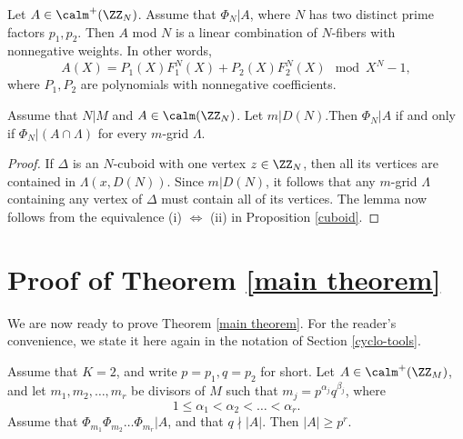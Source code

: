 \begin{lemma}\label{structure-thm} 
Let $A\in\calm^+(\ZZ_N)$.
Assume that $\Phi_{N}|A$, where $N$ has two distinct prime factors $p_1,p_2$. Then $A$ mod $N$ is a linear combination of $N$-fibers with nonnegative weights. In other words,
$$A(X)=P_1(X)F^N_1(X)+ P_2(X)F^N_2(X) \mod X^N-1,$$
where $P_1,P_2$ are polynomials with nonnegative coefficients.

\end{lemma}



\begin{lemma}\label{grid-split}
Assume that $N|M$ and $A\in\calm(\ZZ_N)$. Let $m|D(N)$.Then $\Phi_N|A$ if and only if $\Phi_N|(A\cap\Lambda)$ for every $m$-grid $\Lambda$.
\end{lemma}

\begin{proof}
If $\Delta$ is an $N$-cuboid with one vertex $z\in\ZZ_N$, then all its vertices are contained in $\Lambda(x,D(N))$. Since $m|D(N)$, it follows that any $m$-grid $\Lambda$ containing any vertex of $\Delta$ must contain all of its vertices. The lemma now 
follows from the equivalence (i) $\Leftrightarrow$ (ii) in Proposition \ref{cuboid}.
\end{proof}

%


\section{Proof of Theorem \ref{main theorem}}\label{main-proof}


We are now ready to prove Theorem \ref{main theorem}. For the reader's convenience, we state it here again in the notation of Section \ref{cyclo-tools}.


\begin{proposition}\label{2primebound}
Assume that $K=2$, and write $p=p_1,q=p_2$ for short.
Let $A\in\calm^+(\ZZ_M)$, and let $m_1,m_2,\dots,m_r$ be divisors of $M$ such that $m_j=p^{\alpha_j} q^{\beta_j}$, where
$$
1\leq\alpha_1<\alpha_2<\dots <\alpha_r.
$$
Assume that $\Phi_{m_1}\Phi_{m_2}\dots \Phi_{m_r}|A$, and that $q\nmid |A|$.
Then $|A|\geq p^r$.
\end{proposition}

